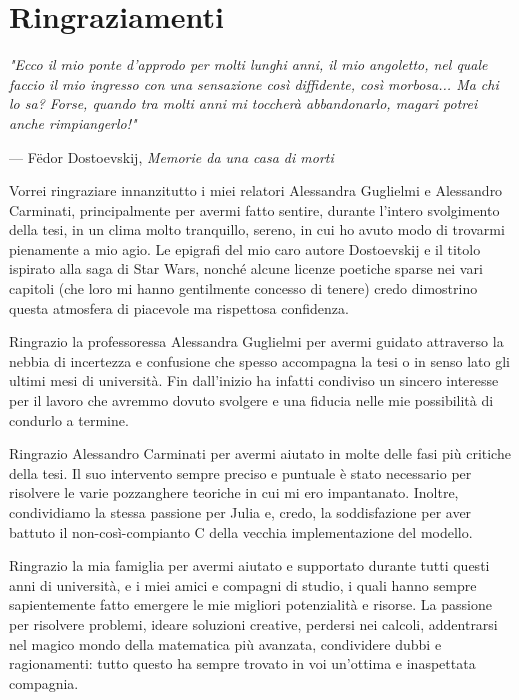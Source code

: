 \documentclass[12pt,	%
	a4paper,		%
	twoside,		%
	openright,		%
	titlepage,%
	]{book}
\theoremstyle{definition}
\begin{document}
\cleardoublepage
\chapter*{Ringraziamenti}

\setlength{}
\epigraph{\itshape 
"Ecco il mio ponte d'approdo per molti lunghi anni, il mio angoletto, nel quale faccio il mio ingresso con una sensazione così diffidente, così morbosa... Ma chi lo sa? Forse, quando tra molti anni mi toccherà abbandonarlo, magari potrei anche rimpiangerlo!"}
{--- F\"{e}dor Dostoevskij, \textit{Memorie da una casa di morti}}
\setlength{}

Vorrei ringraziare innanzitutto i miei relatori Alessandra Guglielmi e Alessandro Carminati, principalmente per avermi fatto sentire, durante l'intero svolgimento della tesi, in un clima molto tranquillo, sereno, in cui ho avuto modo di trovarmi pienamente a mio agio. Le epigrafi del mio caro autore Dostoevskij e il titolo ispirato alla saga di Star Wars, nonché alcune licenze poetiche sparse nei vari capitoli (che loro mi hanno gentilmente concesso di tenere) credo dimostrino questa atmosfera di piacevole ma rispettosa confidenza.

Ringrazio la professoressa Alessandra Guglielmi per avermi guidato attraverso la nebbia di incertezza e confusione che spesso accompagna la tesi o in senso lato gli ultimi mesi di università. Fin dall'inizio ha infatti condiviso un sincero interesse per il lavoro che avremmo dovuto svolgere e una fiducia nelle mie possibilità di condurlo a termine.

Ringrazio Alessandro Carminati per avermi aiutato in molte delle fasi più critiche della tesi. Il suo intervento sempre preciso e puntuale è stato necessario per risolvere le varie pozzanghere teoriche in cui mi ero impantanato. Inoltre, condividiamo la stessa passione per Julia e, credo, la soddisfazione per aver battuto il non-così-compianto C della vecchia implementazione del modello.

Ringrazio la mia famiglia per avermi aiutato e supportato durante tutti questi anni di università, e i miei amici e compagni di studio, i quali hanno sempre sapientemente fatto emergere le mie migliori potenzialità e risorse. La passione per risolvere problemi, ideare soluzioni creative, perdersi nei calcoli, addentrarsi nel magico mondo della matematica più avanzata, condividere dubbi e ragionamenti: tutto questo ha sempre trovato in voi un'ottima e inaspettata compagnia.
\end{document}
